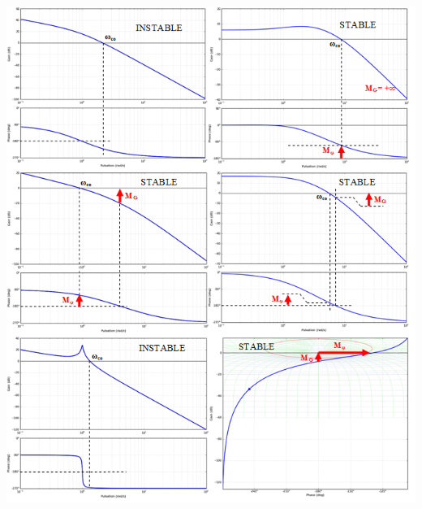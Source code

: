 \documentclass[10pt,fleqn]{article} %
\begin{document}
\begin{multicols}{2}
\end{multicols}



\newpage

\begin{center}
\includegraphics[width=\linewidth]{images/cor_01}
%
%
%
%
\end{center}
\end{document}

